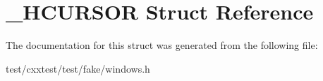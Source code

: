 \hypertarget{struct__HCURSOR}{\section{\-\_\-\-H\-C\-U\-R\-S\-O\-R Struct Reference}
\label{struct__HCURSOR}
}


The documentation for this struct was generated from the following file\-:\begin{DoxyCompactItemize}
\item 
test/cxxtest/test/fake/windows.\-h\end{DoxyCompactItemize}
